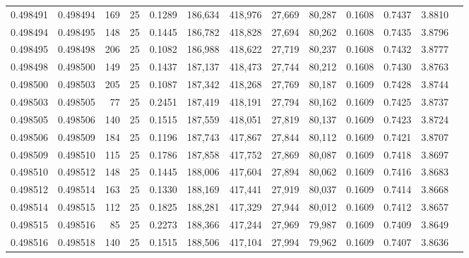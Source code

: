 \begin{tabular}{rrrrrrrrrrrrr}
0.498491 & 0.498494 & 169 &  25 &                                     0.1289 & 186,634 & 418,976 &  27,669 &  80,287 & 0.1608 & 0.7437 & 3.8810 \\
0.498494 & 0.498495 & 148 &  25 &                                     0.1445 & 186,782 & 418,828 &  27,694 &  80,262 & 0.1608 & 0.7435 & 3.8796 \\
0.498495 & 0.498498 & 206 &  25 &                                     0.1082 & 186,988 & 418,622 &  27,719 &  80,237 & 0.1608 & 0.7432 & 3.8777 \\
0.498498 & 0.498500 & 149 &  25 &                                     0.1437 & 187,137 & 418,473 &  27,744 &  80,212 & 0.1608 & 0.7430 & 3.8763 \\
0.498500 & 0.498503 & 205 &  25 &                                     0.1087 & 187,342 & 418,268 &  27,769 &  80,187 & 0.1609 & 0.7428 & 3.8744 \\
0.498503 & 0.498505 &  77 &  25 &                                     0.2451 & 187,419 & 418,191 &  27,794 &  80,162 & 0.1609 & 0.7425 & 3.8737 \\
0.498505 & 0.498506 & 140 &  25 &                                     0.1515 & 187,559 & 418,051 &  27,819 &  80,137 & 0.1609 & 0.7423 & 3.8724 \\
0.498506 & 0.498509 & 184 &  25 &                                     0.1196 & 187,743 & 417,867 &  27,844 &  80,112 & 0.1609 & 0.7421 & 3.8707 \\
0.498509 & 0.498510 & 115 &  25 &                                     0.1786 & 187,858 & 417,752 &  27,869 &  80,087 & 0.1609 & 0.7418 & 3.8697 \\
0.498510 & 0.498512 & 148 &  25 &                                     0.1445 & 188,006 & 417,604 &  27,894 &  80,062 & 0.1609 & 0.7416 & 3.8683 \\
0.498512 & 0.498514 & 163 &  25 &                                     0.1330 & 188,169 & 417,441 &  27,919 &  80,037 & 0.1609 & 0.7414 & 3.8668 \\
0.498514 & 0.498515 & 112 &  25 &                                     0.1825 & 188,281 & 417,329 &  27,944 &  80,012 & 0.1609 & 0.7412 & 3.8657 \\
0.498515 & 0.498516 &  85 &  25 &                                     0.2273 & 188,366 & 417,244 &  27,969 &  79,987 & 0.1609 & 0.7409 & 3.8649 \\
0.498516 & 0.498518 & 140 &  25 &                                     0.1515 & 188,506 & 417,104 &  27,994 &  79,962 & 0.1609 & 0.7407 & 3.8636 \\

\end{tabular}
